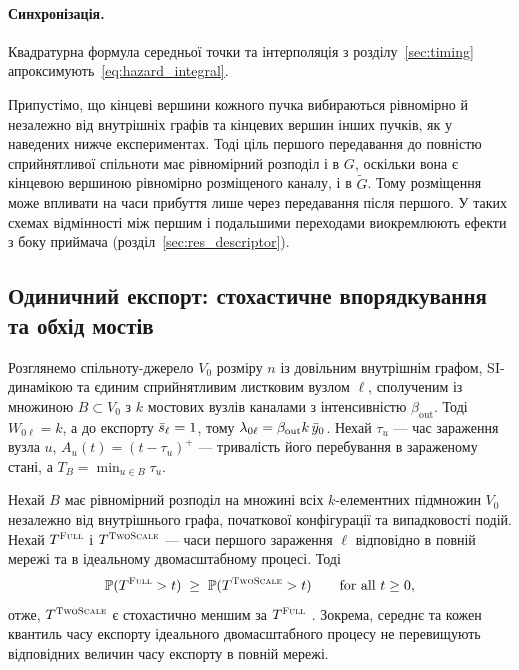 \paragraph{Синхронізація.}
Квадратурна формула середньої точки та інтерполяція з розділу~\ref{sec:timing} апроксимують~\eqref{eq:hazard_integral}.

\begin{remark}
\label{rem:placement}
Припустімо, що кінцеві вершини кожного пучка вибираються рівномірно й незалежно від внутрішніх графів та кінцевих вершин інших пучків, як у наведених нижче експериментах. Тоді ціль першого передавання до повністю сприйнятливої спільноти має рівномірний розподіл і в $G$, оскільки вона є кінцевою вершиною рівномірно розміщеного каналу, і в $\tilde G$. Тому розміщення може впливати на часи прибуття лише через передавання після першого. У таких схемах відмінності між першим і подальшими переходами виокремлюють ефекти з боку приймача (розділ~\ref{sec:res_descriptor}).
\end{remark}

\subsection{Одиничний експорт: стохастичне впорядкування та обхід мостів}
\label{sec:single_export}

Розглянемо спільноту-джерело $V_0$ розміру $n$ із довільним внутрішнім графом, SI-динамікою та єдиним сприйнятливим листковим вузлом $\ell$, сполученим із множиною $B\subset V_0$ з $k$ мостових вузлів каналами з інтенсивністю $\beta_{\mathrm{out}}$. Тоді $W_{0\ell}=k$, а до експорту $\bar{s}_\ell=1$, тому $\lambda_{0\ell}=\beta_{\mathrm{out}}k\,\bar{y}_0$. Нехай $\tau_u$ --- час зараження вузла $u$, $A_u(t)=(t-\tau_u)^+$ --- тривалість його перебування в зараженому стані, а $T_B=\min_{u\in B}\tau_u$.

\begin{proposition}
\label{prop:ordering}
Нехай $B$ має рівномірний розподіл на множині всіх $k$-елементних підмножин $V_0$ незалежно від внутрішнього графа, початкової конфігурації та випадковості подій. Нехай $T^{\textup{\textsc{Full}}}$ і $T^{\textup{\textsc{TwoScale}}}$ --- часи першого зараження $\ell$ відповідно в повній мережі та в ідеальному двомасштабному процесі. Тоді
\[
\mathbb{P}(T^{\textup{\textsc{Full}}}>t)\;\ge\;\mathbb{P}(T^{\textup{\textsc{TwoScale}}}>t)\qquad\text{for all }t\ge0,
\]
отже, $T^{\textup{\textsc{TwoScale}}}$ є стохастично меншим за $T^{\textup{\textsc{Full}}}$ \citep{shaked2007}. Зокрема, середнє та кожен квантиль часу експорту ідеального двомасштабного процесу не перевищують відповідних величин часу експорту в повній мережі.
\end{proposition}

